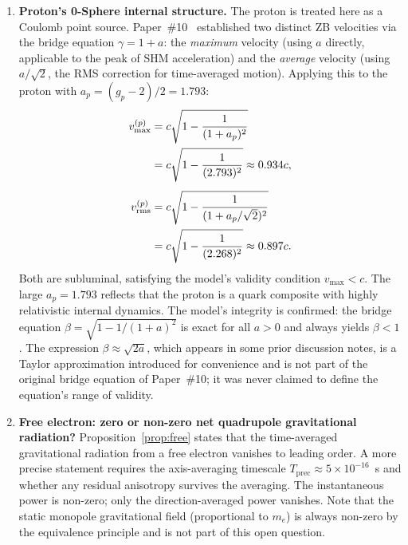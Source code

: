 \documentclass[%
 reprint, amsmath,amssymb, aps, prd, ]{revtex4-2}
\numberwithin{equation}{section}
\begin{document}
\begin{enumerate}[label=(\Alph*), leftmargin=2em]

\item \textbf{Proton's 0-Sphere internal structure.}
The proton is treated here as a Coulomb point source. Paper~\#10~\cite{hanamura10} established two distinct ZB velocities via the bridge equation $\gamma = 1 + a$: the \emph{maximum} velocity (using $a$ directly, applicable to the peak of SHM acceleration) and the \emph{average} velocity (using $a/\sqrt{2}$, the RMS correction for time-averaged motion). Applying this to the proton with $a_p = (g_p-2)/2 = 1.793$:
\begin{align}
v_\mathrm{max}^{(p)}
&= c\sqrt{1 - \frac{1}{(1+a_p)^2}}
\notag\\
&= c\sqrt{1 - \frac{1}{(2.793)^2}}
\approx 0.934c,
\label{eq:vmax_p}\\[4pt]
v_\mathrm{rms}^{(p)}
&= c\sqrt{1 - \frac{1}{(1+a_p/\sqrt{2})^2}}
\notag\\
&= c\sqrt{1 - \frac{1}{(2.268)^2}}
\approx 0.897c.
\label{eq:vrms_p}
\end{align}
Both are subluminal, satisfying the model's validity condition $v_\mathrm{max} < c$. The large $a_p = 1.793$ reflects that the proton is a quark composite with highly relativistic internal dynamics. The model's integrity is confirmed: the bridge equation $\beta = \sqrt{1-1/(1+a)^2}$ is exact for all $a > 0$ and always yields $\beta < 1$. The expression $\beta \approx \sqrt{2a}$, which appears in some prior discussion notes, is a Taylor approximation introduced for convenience and is not part of the original bridge equation of Paper~\#10; it was never claimed to define the equation's range of validity.

\item \textbf{Free electron: zero or non-zero net quadrupole gravitational radiation?}
Proposition~\ref{prop:free} states that the time-averaged gravitational radiation from a free electron vanishes to leading order. A more precise statement requires the axis-averaging timescale $T_\mathrm{prec} \approx 5\times10^{-16}$~s and whether any residual anisotropy survives the averaging. The instantaneous power is non-zero; only the direction-averaged power vanishes. Note that the static monopole gravitational field (proportional to $m_e$) is always non-zero by the equivalence principle and is not part of this open question.


\end{enumerate}
\end{document}
